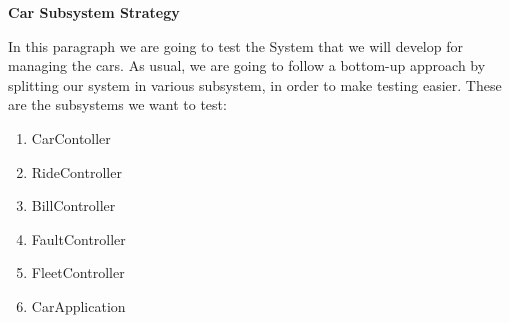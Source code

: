 \documentclass{article}
\begin{document}
\begin{large}
\textbf{Car Subsystem Strategy}
\end{large}

In this paragraph we are going to test the System that we will develop for managing the cars. As usual, we are going to follow a bottom-up approach by splitting our system in various subsystem, in order to make testing easier. These are the subsystems we want to test:

\begin{enumerate}
\item CarContoller
\item RideController
\item BillController
\item FaultController
\item FleetController
\item CarApplication
\end{enumerate}
\end{document}
